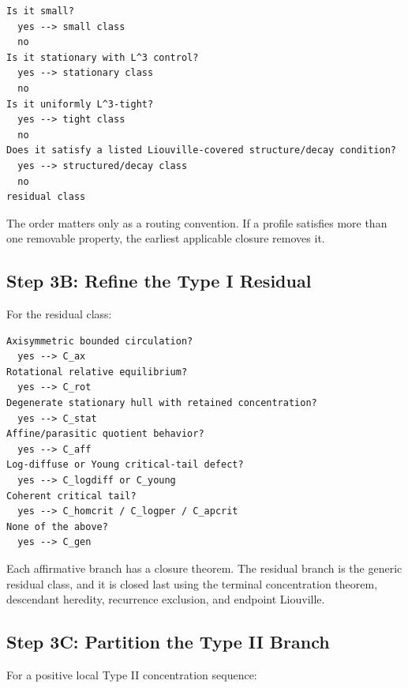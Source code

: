 \documentclass[11pt]{amsart}
\begin{document}
\begin{center}
\begin{minipage}{0.92\linewidth}
\scriptsize
\begin{verbatim}
Is it small?
  yes --> small class
  no
Is it stationary with L^3 control?
  yes --> stationary class
  no
Is it uniformly L^3-tight?
  yes --> tight class
  no
Does it satisfy a listed Liouville-covered structure/decay condition?
  yes --> structured/decay class
  no
residual class
\end{verbatim}
\end{minipage}
\end{center}

The order matters only as a routing convention.  If a profile satisfies more than one removable property, the earliest applicable closure removes it.

\subsection{Step 3B: Refine the Type I Residual}

For the residual class:

\begin{center}
\begin{minipage}{0.92\linewidth}
\scriptsize
\begin{verbatim}
Axisymmetric bounded circulation?
  yes --> C_ax
Rotational relative equilibrium?
  yes --> C_rot
Degenerate stationary hull with retained concentration?
  yes --> C_stat
Affine/parasitic quotient behavior?
  yes --> C_aff
Log-diffuse or Young critical-tail defect?
  yes --> C_logdiff or C_young
Coherent critical tail?
  yes --> C_homcrit / C_logper / C_apcrit
None of the above?
  yes --> C_gen
\end{verbatim}
\end{minipage}
\end{center}

Each affirmative branch has a closure theorem.  The residual branch is the generic residual class, and it is closed last using the terminal concentration theorem, descendant heredity, recurrence exclusion, and endpoint Liouville.

\subsection{Step 3C: Partition the Type II Branch}

For a positive local Type II concentration sequence:
\end{document}
